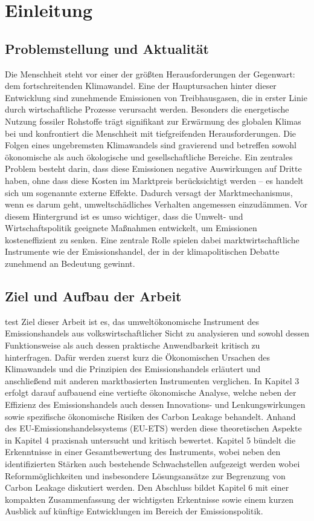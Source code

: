 \chapter{Einleitung}

\section{Problemstellung und Aktualität}

Die Menschheit steht vor einer der größten Herausforderungen der Gegenwart: dem fortschreitenden Klimawandel.
Eine der Hauptursachen hinter dieser Entwicklung sind zunehmende Emissionen von Treibhausgasen, die in erster Linie durch wirtschaftliche Prozesse verursacht werden.
Besonders die energetische Nutzung fossiler Rohstoffe trägt signifikant zur Erwärmung des globalen Klimas bei und konfrontiert die Menschheit mit tiefgreifenden Herausforderungen.
Die Folgen eines ungebremsten Klimawandels sind gravierend und betreffen sowohl ökonomische als auch ökologische und gesellschaftliche Bereiche.
Ein zentrales Problem besteht darin, dass diese Emissionen negative Auswirkungen auf Dritte haben, ohne dass diese Kosten im Marktpreis berücksichtigt werden – es handelt sich um sogenannte externe Effekte. Dadurch versagt der Marktmechanismus, wenn es darum geht, umweltschädliches Verhalten angemessen einzudämmen.
Vor diesem Hintergrund ist es umso wichtiger, dass die Umwelt- und Wirtschaftspolitik geeignete Maßnahmen entwickelt, um Emissionen kosteneffizient zu senken. Eine zentrale Rolle spielen dabei marktwirtschaftliche Instrumente wie der Emissionshandel, der in der klimapolitischen Debatte zunehmend an Bedeutung gewinnt.

\section{Ziel und Aufbau der Arbeit}
test
Ziel dieser Arbeit ist es, das umweltökonomische Instrument des Emissionshandels aus volkswirtschaftlicher Sicht zu analysieren und sowohl dessen Funktionsweise als auch dessen praktische Anwendbarkeit kritisch zu hinterfragen.
Dafür werden zuerst kurz die Ökonomischen Ursachen des Klimawandels und die Prinzipien des Emissionshandels erläutert und anschließend mit anderen marktbasierten Instrumenten verglichen. 
In Kapitel 3 erfolgt darauf aufbauend eine vertiefte ökonomische Analyse, welche neben der Effizienz des Emissionshandels auch dessen Innovations- und Lenkungswirkungen sowie spezifische ökonomische Risiken des Carbon Leakage behandelt.
Anhand des EU-Emissionshandelssystems (EU-ETS) werden diese theoretischen Aspekte in Kapitel 4 praxisnah untersucht und kritisch bewertet.
Kapitel 5 bündelt die Erkenntnisse in einer Gesamtbewertung des Instruments, wobei neben den identifizierten Stärken auch bestehende Schwachstellen aufgezeigt werden wobei Reformmöglichkeiten und insbesondere Lösungsansätze zur Begrenzung von Carbon Leakage diskutiert werden.
Den Abschluss bildet Kapitel 6 mit einer kompakten Zusammenfassung der wichtigsten Erkentnisse sowie einem kurzen Ausblick auf künftige Entwicklungen im Bereich der Emissionspolitik.


\nocite{*}

